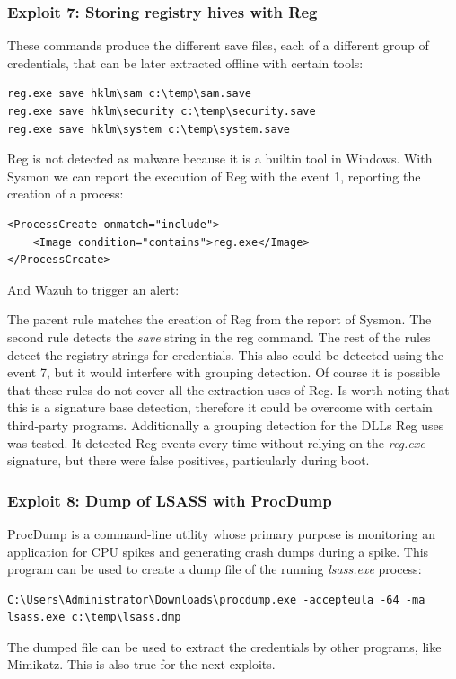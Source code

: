 \subsubsection{Exploit 7: Storing registry hives with Reg}
These commands produce the different save files, each of a different group of credentials, that can be later extracted offline with certain tools\cite{more_dumps}:
\begin{lstlisting}[style=PS]
reg.exe save hklm\sam c:\temp\sam.save
reg.exe save hklm\security c:\temp\security.save
reg.exe save hklm\system c:\temp\system.save
\end{lstlisting}
\linej
Reg is not detected as malware because it is a builtin tool in Windows. With Sysmon we can report the execution of Reg with the event 1, reporting the creation of a process:
\begin{lstlisting}[style=xml]
<ProcessCreate onmatch="include">
	<Image condition="contains">reg.exe</Image>
</ProcessCreate>
\end{lstlisting}
\linej
And Wazuh to trigger an alert:

\linej
The parent rule matches the creation of Reg from the report of Sysmon.
\linej
The second rule detects the \textit{save} string in the reg command.
\linej
The rest of the rules detect the registry strings for credentials.
\linej
\linej
This also could be detected using the event 7, but it would interfere with grouping detection. Of course it is possible that these rules do not cover all the extraction uses of Reg. Is worth noting that this is a signature base detection, therefore it could be overcome with certain third-party programs.
\linej
\linej
Additionally a grouping detection for the DLLs Reg uses was tested. It detected Reg events every time without relying on the \textit{reg.exe} signature, but there were false positives, particularly during boot.

\subsubsection{Exploit 8: Dump of LSASS with ProcDump}
ProcDump\cite{procdump} is a command-line utility whose primary purpose is monitoring an application for CPU spikes and generating crash dumps during a spike. This program can be used to create a dump file of the running \textit{lsass.exe} process:
\begin{lstlisting}[style=PS,numbers=none]
C:\Users\Administrator\Downloads\procdump.exe -accepteula -64 -ma lsass.exe c:\temp\lsass.dmp
\end{lstlisting}
\linej
The dumped file can be used to extract the credentials by other programs, like Mimikatz\cite{more_dumps}. This is also true for the next exploits.

